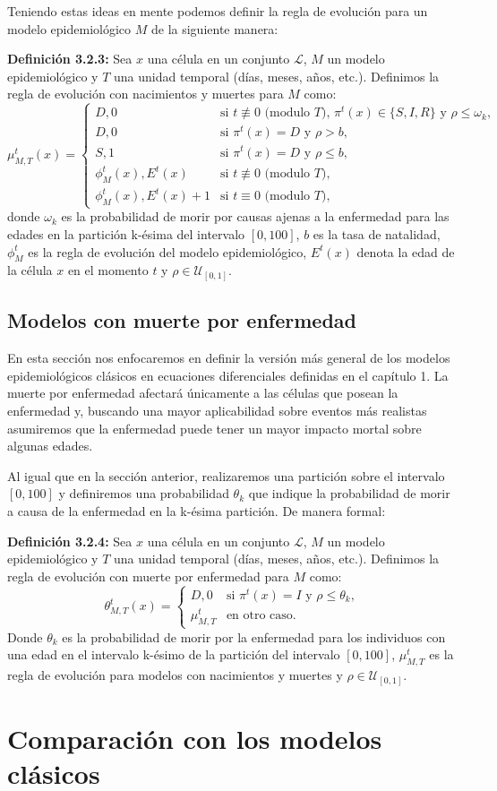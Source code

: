 Teniendo estas ideas en mente podemos definir la regla de evolución para un modelo epidemiológico $M$ de la siguiente manera:

\textbf{Definición 3.2.3:} Sea $x$ una célula en un conjunto $\mathcal{L}$, $M$ un modelo epidemiológico y $T$ una unidad temporal (días, meses, años, etc.). Definimos la regla de evolución con nacimientos y muertes para $M$ como:
\begin{equation}
    \mu_{M,T}^t(x)=\left\{\begin{array}{ll}
        D,0 & \text{si }t\not\equiv 0 \text{ (modulo }T\text{), }\pi^t(x)\in\{S,I,R\}\text{ y }\rho\leq\omega_k, \\
        D,0 & \text{si }\pi^t(x)=D\text{ y }\rho>b,\\
        S,1 & \text{si }\pi^t(x)=D\text{ y }\rho\leq b,\\
        \phi_M^t(x),E^t(x) & \text{si }t\not\equiv 0 \text{ (modulo }T),\\
        \phi_M^t(x),E^t(x)+1 & \text{si }t\equiv 0 \text{ (modulo }T),
    \end{array}\right.
\end{equation}
donde $\omega_k$ es la probabilidad de morir por causas ajenas a la enfermedad para las edades en la partición k-ésima del intervalo $[0,100]$, $b$ es la tasa de natalidad, $\phi_M^t$ es la regla de evolución del modelo epidemiológico, $E^t(x)$ denota la edad de la célula $x$ en el momento $t$ y $\rho\in\mathcal{U}_{[0,1]}$.
\subsection{Modelos con muerte por enfermedad}
En esta sección nos enfocaremos en definir la versión más general de los modelos epidemiológicos clásicos en ecuaciones diferenciales definidas en el capítulo 1. La muerte por enfermedad afectará únicamente a las células que posean la enfermedad y, buscando una mayor aplicabilidad sobre eventos más realistas asumiremos que la enfermedad puede tener un mayor impacto mortal sobre algunas edades. 

Al igual que en la sección anterior, realizaremos una partición sobre el intervalo $[0,100]$ y definiremos una probabilidad $\theta_k$ que indique la probabilidad de morir a causa de la enfermedad en la k-ésima partición. De manera formal:

\textbf{Definición 3.2.4:} Sea $x$ una célula en un conjunto $\mathcal{L}$, $M$ un modelo epidemiológico y $T$ una unidad temporal (días, meses, años, etc.). Definimos la regla de evolución con muerte por enfermedad para $M$ como:
\begin{equation}
    \theta_{M,T}^t(x)=\left\{\begin{array}{ll}
        D,0 & \text{si }\pi^t(x)=I\text{ y }\rho\leq\theta_k, \\
        \mu_{M,T}^t & \text{en otro caso.}
    \end{array}\right.
\end{equation}
Donde $\theta_k$ es la probabilidad de morir por la enfermedad para los individuos con una edad en el intervalo k-ésimo de la partición del intervalo $[0,100]$, $\mu_{M,T}^t$ es la regla de evolución para modelos con nacimientos y muertes y $\rho\in\mathcal{U}_{[0,1]}$.
\section{Comparación con los modelos clásicos}